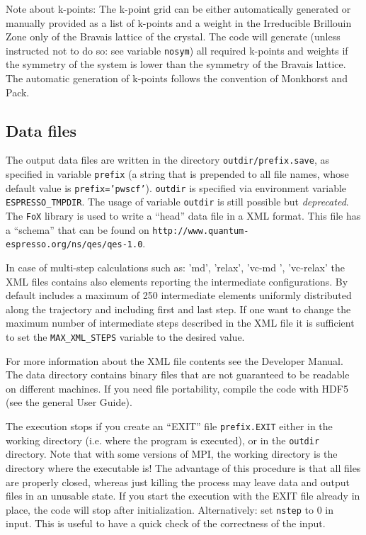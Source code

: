 \documentclass[12pt,a4paper]{article}
\def\ttquote{\textsf{'}}
\begin{document}
Note about k-points: The k-point grid can be either automatically generated 
or manually provided as a list of k-points and a weight in the Irreducible
Brillouin Zone only of the Bravais lattice of the crystal. The code will 
generate (unless instructed not to do so: see variable \texttt{nosym}) all
required k-points
and weights if the symmetry of the system is lower than the symmetry of the
Bravais lattice. The automatic generation of k-points follows the convention
of Monkhorst and Pack.

\subsection{Data files}

The output data files are written in the directory \texttt{outdir/prefix.save},
as specified in variable \texttt{prefix} (a string that is prepended
to all file names, whose default value is \texttt{prefix='pwscf'}).
\texttt{outdir} is specified via environment variable
\texttt{ESPRESSO\_TMPDIR}. The usage of variable \texttt{outdir} is
still possible but {\em deprecated}. The \texttt{FoX} library is used
to write a ``head'' data file in a XML format. This file has a ``schema''
that can be found on \texttt{http://www.quantum-espresso.org/ns/qes/qes-1.0}.

In case of multi-step calculations such as: {\ttfamily \ttquote md\ttquote, \ttquote relax\ttquote, 
\ttquote vc-md \ttquote, \ttquote vc-relax\ttquote} the XML files contains also elements reporting the intermediate 
configurations. By default includes a maximum of 250 intermediate elements uniformly distributed along the trajectory 
and including first and last step. If one want to change the maximum number of intermediate steps described in the 
XML file it is sufficient to set the \texttt{MAX\_XML\_STEPS} variable to the desired  value.  

For more information about the XML file contents see  the Developer Manual. The data directory contains
binary files that are not guaranteed to be readable on different machines.
If you need file portability, compile the code with HDF5 (see the general
User Guide).

The execution stops if you create an ``EXIT'' file \texttt{prefix.EXIT} either
in the working directory (i.e. where the program is executed), or in
the  \texttt{outdir} directory. Note that with some versions of MPI,
the working directory  is the directory where the executable is! 
The advantage of this procedure is that all files are properly closed, 
whereas  just killing the process may leave data and output files in 
an unusable state. If you start the execution with the EXIT file already
in place, the code will stop after initialization. Alternatively:
set \texttt{nstep} to 0 in input. This is useful to have
a quick check of the correctness of the input. 
\end{document}
